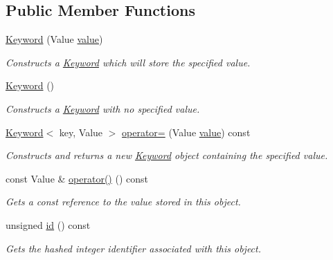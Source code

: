 \subsection*{Public Member Functions}
\begin{DoxyCompactItemize}
\item 
\hyperlink{classmarian_1_1keywords_1_1Keyword_a6e345b92a10a857f9adee5358b7f03f4}{Keyword} (Value \hyperlink{namespacemarian_1_1keywords_ac70de1b4c3cf6b7080cf5086f2963fd8}{value})
\begin{DoxyCompactList}\small\item\em Constructs a {\ttfamily \hyperlink{classmarian_1_1keywords_1_1Keyword}{Keyword}} which will store the specified value. \end{DoxyCompactList}\item 
\hyperlink{classmarian_1_1keywords_1_1Keyword_a24b569bb22e4321e5f66929d6ed30f92}{Keyword} ()
\begin{DoxyCompactList}\small\item\em Constructs a {\ttfamily \hyperlink{classmarian_1_1keywords_1_1Keyword}{Keyword}} with no specified value. \end{DoxyCompactList}\item 
\hyperlink{classmarian_1_1keywords_1_1Keyword}{Keyword}$<$ key, Value $>$ \hyperlink{classmarian_1_1keywords_1_1Keyword_a1aa0c6e53e5c529b85389b2a66f200c9}{operator=} (Value \hyperlink{namespacemarian_1_1keywords_ac70de1b4c3cf6b7080cf5086f2963fd8}{value}) const 
\begin{DoxyCompactList}\small\item\em Constructs and returns a new {\ttfamily \hyperlink{classmarian_1_1keywords_1_1Keyword}{Keyword}} object containing the specified value. \end{DoxyCompactList}\item 
const Value \& \hyperlink{classmarian_1_1keywords_1_1Keyword_a26d1f37932f8c8022684008752e2ece1}{operator()} () const 
\begin{DoxyCompactList}\small\item\em Gets a const reference to the value stored in this object. \end{DoxyCompactList}\item 
unsigned \hyperlink{classmarian_1_1keywords_1_1Keyword_a5216afbffb3db4b7c7b536f94cf44c25}{id} () const 
\begin{DoxyCompactList}\small\item\em Gets the hashed integer identifier associated with this object. \end{DoxyCompactList}\end{DoxyCompactItemize}
